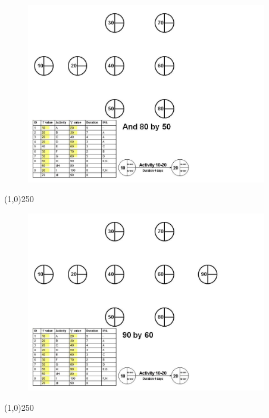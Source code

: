 \begin{frame}
\begin{figure}
	\centering
		\includegraphics[width = 10.5cm]{oldnotes/Slide88.jpg}
\end{figure}
\end{frame}
\begin{center}\line(1,0){250}\end{center}


\begin{frame}
\begin{figure}
	\centering
		\includegraphics[width = 10.5cm]{oldnotes/Slide89.jpg}
\end{figure}
\end{frame}
\begin{center}\line(1,0){250}\end{center}


